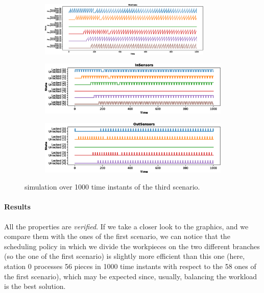 \documentclass[a4paper]{article}
\begin{document}
    \begin{figure}[h!]
        \begin{subfigure}{\textwidth}
            \centering
            \includegraphics[width=0.9\textwidth]{images/scenarios/scenario3_stations}
        \end{subfigure}
        \begin{subfigure}{0.49\textwidth}
            \centering
            \includegraphics[width=\textwidth]{images/scenarios/scenario3_insensors}
        \end{subfigure}
        \hfill
        \begin{subfigure}{0.49\textwidth}
            \centering
            \includegraphics[width=\textwidth]{images/scenarios/scenario3_outsensors}
        \end{subfigure}
        \caption{simulation over 1000 time instants of the third scenario.}
        \label{figure:scenario:3}
    \end{figure}

    \paragraph{Results} All the properties are \textit{verified}. If we take a closer look to the graphics, and we compare them with the ones of the first scenario, we can notice that the scheduling policy in which we divide the workpieces on the two different branches (so the one of the first scenario) is slightly more efficient than this one (here, station 0 processes 56 pieces in 1000 time instants with respect to the 58 ones of the first scenario), which may be expected since, usually, balancing the workload is the best solution.
\end{document}
